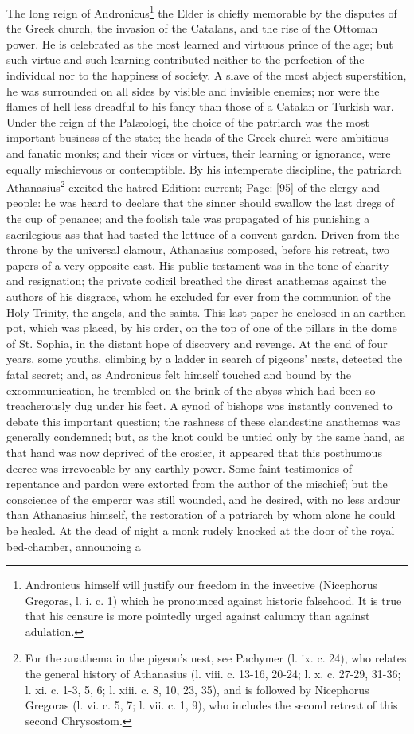 The long reign of Andronicus\footnote{Andronicus himself will justify our freedom in the invective (Nicephorus Gregoras, l. i. c. 1) which he pronounced against historic falsehood. It is true that his censure is more pointedly urged against calumny than against adulation.} the Elder is chiefly memorable by the disputes of the Greek church, the invasion of the Catalans, and the rise of the Ottoman power. He is celebrated as the most learned and virtuous prince of the age; but such virtue and such learning contributed neither to the perfection of the individual nor to the happiness of society. A slave of the most abject superstition, he was surrounded on all sides by visible and invisible enemies; nor were the flames of hell less dreadful to his fancy than those of a Catalan or Turkish war. Under the reign of the Palæologi, the choice of the patriarch was the most important business of the state; the heads of the Greek church were ambitious and fanatic monks; and their vices or virtues, their learning or ignorance, were equally mischievous or contemptible. By his intemperate discipline, the patriarch Athanasius\footnote{For the anathema in the pigeon\texthebrew{}’s nest, see Pachymer (l. ix. c. 24), who relates the general history of Athanasius (l. viii. c. 13-16, 20-24; l. x. c. 27-29, 31-36; l. xi. c. 1-3, 5, 6; l. xiii. c. 8, 10, 23, 35), and is followed by Nicephorus Gregoras (l. vi. c. 5, 7; l. vii. c. 1, 9), who includes the second retreat of this second Chrysostom.} excited the hatred Edition: current; Page: [95] of the clergy and people: he was heard to declare that the sinner should swallow the last dregs of the cup of penance; and the foolish tale was propagated of his punishing a sacrilegious ass that had tasted the lettuce of a convent-garden. Driven from the throne by the universal clamour, Athanasius composed, before his retreat, two papers of a very opposite cast. His public testament was in the tone of charity and resignation; the private codicil breathed the direst anathemas against the authors of his disgrace, whom he excluded for ever from the communion of the Holy Trinity, the angels, and the saints. This last paper he enclosed in an earthen pot, which was placed, by his order, on the top of one of the pillars in the dome of St. Sophia, in the distant hope of discovery and revenge. At the end of four years, some youths, climbing by a ladder in search of pigeons\texthebrew{}’ nests, detected the fatal secret; and, as Andronicus felt himself touched and bound by the excommunication, he trembled on the brink of the abyss which had been so treacherously dug under his feet. A synod of bishops was instantly convened to debate this important question; the rashness of these clandestine anathemas was generally condemned; but, as the knot could be untied only by the same hand, as that hand was now deprived of the crosier, it appeared that this posthumous decree was irrevocable by any earthly power. Some faint testimonies of repentance and pardon were extorted from the author of the mischief; but the conscience of the emperor was still wounded, and he desired, with no less ardour than Athanasius himself, the restoration of a patriarch by whom alone he could be healed. At the dead of night a monk rudely knocked at the door of the royal bed-chamber, announcing a 
